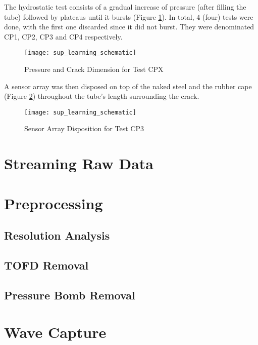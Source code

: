 
The hydrostatic test consists of a gradual increase of pressure (after filling the tube) followed by plateaus until it bursts (Figure \ref{fig:pressure_time}). In total, $4$ (four) tests were done, with the first one discarded since it did not burst. They were denominated CP1, CP2, CP3 and CP4 respectively.

\begin{figure}[H]
	\centering
	\texttt{[image: sup\_learning\_schematic]}
	\caption{Pressure and Crack Dimension for Test CPX}
	\label{fig:pressure_time}
\end{figure}

A sensor array was then disposed on top of the naked steel and the rubber cape (Figure \ref{fig:sensor_disposition}) throughout the tube's length surrounding the crack.

\begin{figure}[H]
	\centering
	\texttt{[image: sup\_learning\_schematic]}
	\caption{Sensor Array Disposition for Test CP3}
	\label{fig:sensor_disposition}
\end{figure}

\section{Streaming Raw Data}

\section{Preprocessing}
\subsection{Resolution Analysis}

\subsection{TOFD Removal} \label{sec:TOFDRemoval}
\subsection{Pressure Bomb Removal} \label{sec:bombRemoval}

\section{Wave Capture}
